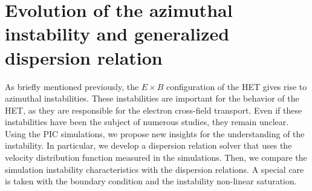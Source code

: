 



\chapter{Evolution of the azimuthal instability and generalized dispersion relation}
\label{ch-5}



\begin{Chabstract}
  
As briefly mentioned previously, the $E \times B$ configuration of the \ac{HET} gives rise to azimuthal instabilities.
These instabilities are important for the behavior of the \ac{HET}, as they are responsible for the electron cross-field transport.
Even if these instabilities have been the subject of numerous studies, they remain unclear.
Using the \ac{PIC} simulations, we propose new insights for the understanding of the instability.
In particular, we develop a dispersion relation solver that uses the velocity distribution function measured in the simulations.
Then, we compare the simulation instability characteristics with the dispersion relations.
A special care is taken with the boundary condition and the instability non-linear saturation.
\end{Chabstract}

% 
% 

\minitoc








